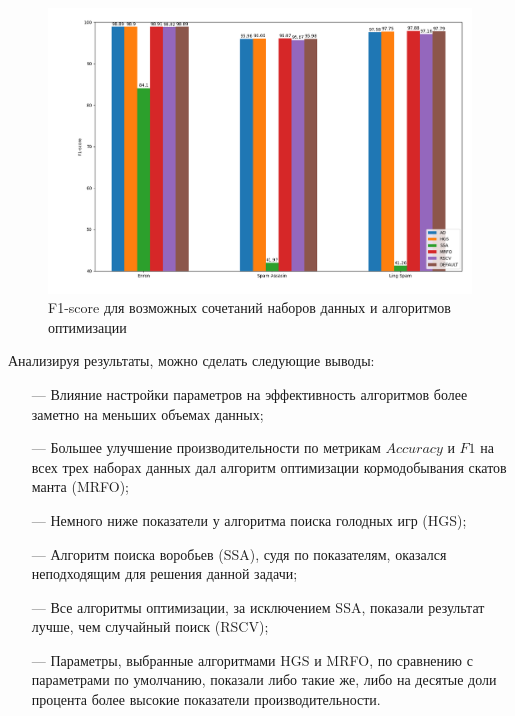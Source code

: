 \begin{figure}[H]
    \centering
    \includegraphics[width=165mm]{static/F1.png}
    \caption{F1-score для возможных сочетаний наборов данных и алгоритмов оптимизации}
    \label{F1Scheme}
\end{figure}

Анализируя результаты, можно сделать следующие выводы:

\begin{itemize}
    \item[—] Влияние настройки параметров на эффективность алгоритмов более заметно на меньших объемах данных;
    \item[—] Большее улучшение производительности по метрикам $Accuracy$ и $F1$ на всех трех наборах данных дал 
    алгоритм оптимизации кормодобывания скатов манта (MRFO);
    \item[—] Немного ниже показатели у алгоритма поиска голодных игр (HGS);
    \item[—] Алгоритм поиска воробьев (SSA), судя по показателям, оказался неподходящим для решения данной задачи;
    \item[—] Все алгоритмы оптимизации, за исключением SSA, показали результат лучше, чем случайный поиск (RSCV);
    \item[—] Параметры, выбранные алгоритмами HGS и MRFO, по сравнению с 
    параметрами по умолчанию, показали либо такие же, либо на десятые доли процента более высокие показатели производительности.
\end{itemize}


